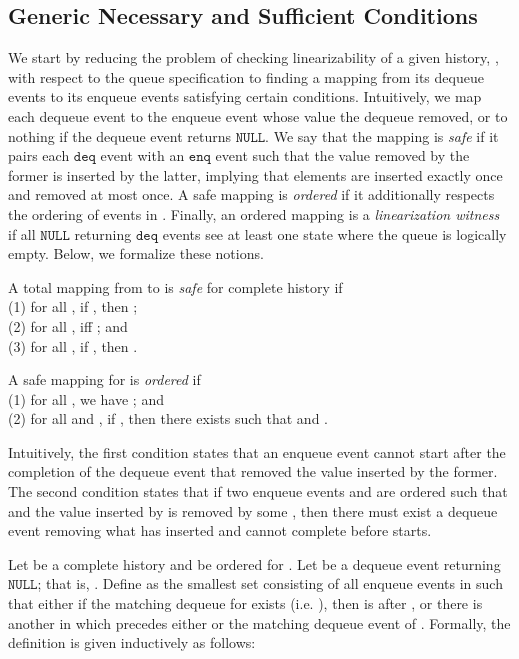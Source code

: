 \documentclass{LMCS}
\newcommand{\NULL}{\ensuremath{\mathtt{NULL}}}
\newcommand{\enq}{\ensuremath{\mathtt{enq}}}
\newcommand{\deq}{\ensuremath{\mathtt{deq}}}
\newcommand\mylabel[1]{\label{#1}}
\begin{document}
\subsection*{Generic Necessary and Sufficient Conditions}

We start by reducing the problem of checking linearizability of a given history, , with respect to the queue specification to finding a mapping from its dequeue events to its enqueue events satisfying certain conditions.
Intuitively, we map each dequeue event to the enqueue event whose value the dequeue removed, or to nothing if the dequeue event returns \NULL.
We say that the mapping is {\em safe} if it pairs each {\deq} event with an {\enq} event such that the value removed by the former is inserted by the latter, 
implying that elements are inserted exactly once and removed at most once.
A safe mapping is {\em ordered} if it additionally respects the ordering of events in .
Finally, an ordered mapping is a {\em linearization witness} if all {\NULL} returning {\deq} events see at least one state where the queue is logically empty.
Below, we formalize these notions.

\begin{defi}\mylabel{def:safe}
A total mapping  from  to  is {\em safe} for complete history  if \\
(1) for all , if , then ;\\
(2) for all ,  iff ; and\\
(3) for all , if , then . 
\end{defi}

\begin{defi}\mylabel{def:ordered}
A safe mapping  for  is {\em ordered} if \\
(1) for all , we have ; and\\
(2) for all  and , if , 
then there exists \mbox{} such that  and .
\end{defi}
Intuitively, the first condition states that an enqueue event cannot start after the completion of the dequeue event that removed the value inserted by the former.
The second condition states that if two enqueue events  and  are ordered such that  and the value inserted by  is removed by some , then there must exist a dequeue event  removing what  has inserted and  cannot complete before  starts.

Let  be a complete history and  be ordered for .
Let  be a dequeue event returning {\NULL}; that is, . 
Define  as the smallest set consisting of all enqueue events  in  such that either if the matching dequeue  for  exists (i.e. ), then  is after , or there is another  in  which precedes either  or the matching dequeue event  of .
Formally, the definition is given inductively as follows:
\end{document}
